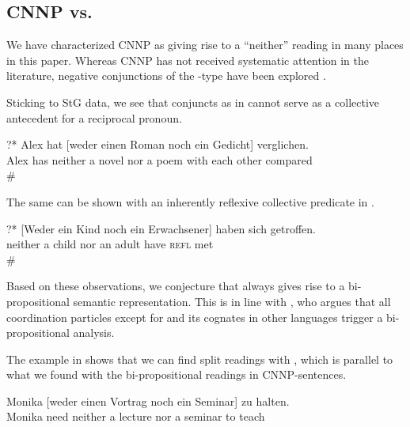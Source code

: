 \documentclass[output=paper]{langsci/langscibook}
\begin{document}
\subsection{CNNP vs.\@ {}}
\label{Sec-NeitherNor}


We have characterized CNNP as giving rise to a ``neither'' reading in many places in this paper.
Whereas CNNP has not received systematic attention in the literature, negative conjunctions of the -type have been explored \citep{deSwart:01ni,Doetjes:05,Gajic:16}.%

Sticking to StG data, we see that  conjuncts as in  cannot serve as a collective antecedent for a reciprocal pronoun.

\ea \label{weder-reci}
\gll ?* Alex hat [weder einen Roman noch ein Gedicht]  verglichen.\\
{} Alex has \hphantom{[}neither a novel nor a poem {with each other} compared\\
\glt \# 
\z 

The same can be shown with an inherently reflexive collective predicate 
in .

\ea \label{weder-treffen}
\gll ?* [Weder ein Kind noch ein Erwachsener] haben sich getroffen.\\
{} \hphantom{[}neither a child nor an adult have \textsc{refl} met\\
\glt \# 
\z 

Based on these observations, we conjecture that  always gives rise to a bi-propositional semantic representation. 
This is in line with \citet[33]{Winter:01}, who argues that all coordination  particles except for  and its cognates in other languages trigger a bi-propositional analysis.

The example in  shows that we can find split readings with , which is parallel
to what we found with the bi-propositional readings in CNNP-sentences.

\ea \label{brauch-weder}
\gll Monika  [weder einen Vortrag noch ein Seminar] zu halten.\\
Monika need \hphantom{[}neither a lecture nor a seminar to teach\\
\glt %
\z 
\end{document}
